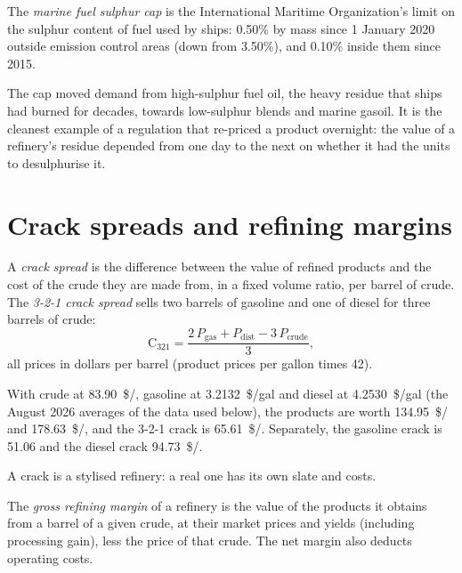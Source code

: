 \begin{definition}\label{def:m3:refined-products-and-cracks:imo}
The \emph{marine fuel sulphur cap} is the
International Maritime Organization's limit on the sulphur content of fuel used by
ships: 0.50\% by mass since 1 January 2020 outside emission control areas (down
from 3.50\%), and 0.10\% inside them since 2015.
\end{definition}

The cap moved demand from high-sulphur fuel oil, the heavy residue that ships had
burned for decades, towards low-sulphur blends and marine gasoil. It is the
cleanest example of a regulation that re-priced a product overnight: the value of
a refinery's residue depended from one day to the next on whether it had the units
to desulphurise it.

\section{Crack spreads and refining margins}

\begin{definition}\label{def:m3:refined-products-and-cracks:crack}
A \emph{crack spread} is the difference between the value of
refined products and the cost of the crude they are made from, in a fixed volume
ratio, per barrel of crude. The \emph{3-2-1 crack spread}
sells two barrels of gasoline and one of diesel for three barrels of crude:
\[
\mathrm{C}_{321} = \frac{2\,P_{\mathrm{gas}} + P_{\mathrm{dist}} - 3\,P_{\mathrm{crude}}}{3},
\]
all prices in dollars per barrel (product prices per gallon times 42).
\end{definition}

\begin{example}\label{ex:m3:refined-products-and-cracks:crack}
With crude at \qty{83.90}{\$/\barrel}, gasoline at \qty{3.2132}{\$/gal} and diesel at
\qty{4.2530}{\$/gal} (the August 2026 averages of the data used below), the products
are worth \qty{134.95}{\$/\barrel} and \qty{178.63}{\$/\barrel}, and the 3-2-1 crack is
\qty{65.61}{\$/\barrel}. Separately, the gasoline crack is \qty{51.06}{} and the diesel
crack \qty{94.73}{\$/\barrel}.
\end{example}

A crack is a stylised refinery: a real one has its own slate and costs.

\begin{definition}\label{def:m3:refined-products-and-cracks:grm}
The \emph{gross refining margin} of a refinery is the
value of the products it obtains from a barrel of a given crude, at their market
prices and yields (including processing gain), less the price of that crude. The net
margin also deducts operating costs.
\end{definition}

